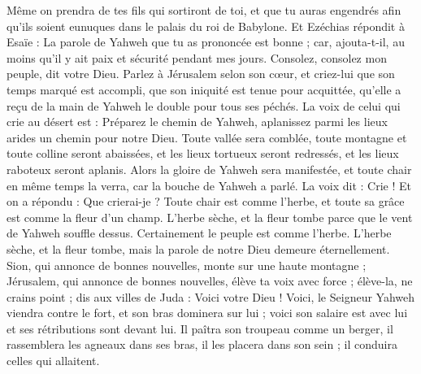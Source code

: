 \begin{multicols}{2}
Même on prendra de tes fils qui sortiront de toi, et que tu auras engendrés afin qu'ils soient eunuques dans le palais du roi de Babylone.
Et Ezéchias répondit à Esaïe : La parole de Yahweh que tu as prononcée est bonne ; car, ajouta-t-il, au moins qu'il y ait paix et sécurité pendant mes jours.
\VerseOne{}Consolez, consolez mon peuple, dit votre Dieu.
Parlez à Jérusalem selon son cœur, et criez-lui que son temps marqué est accompli, que son iniquité est tenue pour acquittée, qu'elle a reçu de la main de Yahweh le double pour tous ses péchés.
La voix de celui qui crie au désert est : Préparez le chemin de Yahweh, aplanissez parmi les lieux arides un chemin pour notre Dieu.
Toute vallée sera comblée, toute montagne et toute colline seront abaissées, et les lieux tortueux seront redressés, et les lieux raboteux seront aplanis.
Alors la gloire de Yahweh sera manifestée, et toute chair en même temps la verra, car la bouche de Yahweh a parlé.
La voix dit : Crie ! Et on a répondu : Que crierai-je ? Toute chair est comme l'herbe, et toute sa grâce est comme la fleur d'un champ.
L'herbe sèche, et la fleur tombe parce que le vent de Yahweh souffle dessus. Certainement le peuple est comme l'herbe.
L'herbe sèche, et la fleur tombe, mais la parole de notre Dieu demeure éternellement.
Sion, qui annonce de bonnes nouvelles, monte sur une haute montagne ; Jérusalem, qui annonce de bonnes nouvelles, élève ta voix avec force ; élève-la, ne crains point ; dis aux villes de Juda : Voici votre Dieu !
Voici, le Seigneur Yahweh viendra contre le fort, et son bras dominera sur lui ; voici son salaire est avec lui et ses rétributions sont devant lui.
Il paîtra son troupeau comme un berger, il rassemblera les agneaux dans ses bras, il les placera dans son sein ; il conduira celles qui allaitent.

\end{multicols}
